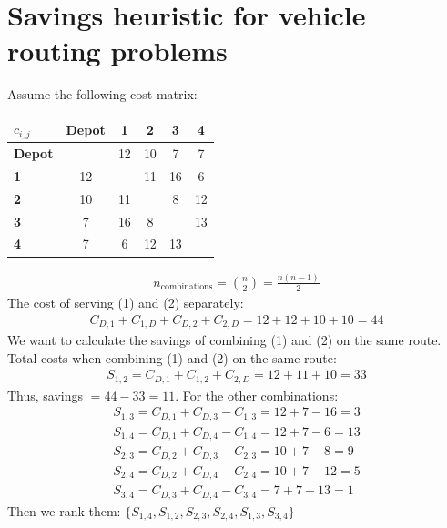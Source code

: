\documentclass[10pt]{article}
\begin{document}
\section{Savings heuristic for vehicle routing problems}
Assume the following cost matrix:
\begin{center}
    \begin{tabular}{|l|c|c|c|c|c|}
        \hline 
        $c_{i, j} $ & \textbf{Depot} & \textbf{1} & \textbf{2} & \textbf{3} & \textbf{4}\\\hline 
        \textbf{Depot} &  & 12 & 10 & 7 & 7 \\\hline 
        \textbf{1} & 12 &   & 11 & 16 & 6 \\\hline 
        \textbf{2} & 10 & 11 &  & 8 & 12 \\\hline 
        \textbf{3} & 7 & 16 & 8 &  & 13 \\\hline 
        \textbf{4} & 7 & 6 & 12 & 13 &  \\\hline 
    \end{tabular}
\end{center}
\begin{gather*}
    \boxed{n_{\text{combinations}} = \binom{n}{2} = \frac{n (n - 1)}{2}}
\end{gather*}
The cost of serving (1) and (2) separately: 
\begin{gather*}
    C_{D, 1} + C_{1, D} + C_{D, 2} + C_{2, D} = 12 + 12 + 10 + 10 = 44
\end{gather*}
We want to calculate the savings of combining (1) and (2) on the same route. Total costs when combining (1) and (2) on the same route: 
\begin{gather*}
    S_{1, 2} = C_{D, 1} + C_{1, 2} + C_{2, D} = 12 + 11 + 10 = 33
\end{gather*}
Thus, savings $ = 44 - 33 = 11 $. For the other combinations: 
\begin{gather*}
    S_{1, 3} = C_{D, 1} + C_{D, 3} - C_{1, 3} = 12 + 7 - 16 = 3\\
    S_{1, 4} = C_{D, 1} + C_{D, 4} - C_{1, 4} = 12 + 7 - 6 = 13\\
    S_{2, 3} = C_{D, 2} + C_{D, 3} - C_{2, 3} = 10 + 7 - 8 = 9\\
    S_{2, 4} = C_{D, 2} + C_{D, 4} - C_{2, 4} = 10 + 7 - 12 = 5\\
    S_{3, 4} = C_{D, 3} + C_{D, 4} - C_{3, 4} = 7 + 7 - 13 = 1
\end{gather*}
Then we rank them: $\{S_{1, 4}, S_{1, 2}, S_{2, 3}, S_{2, 4}, S_{1, 3}, S_{3, 4}\}$
\end{document}
